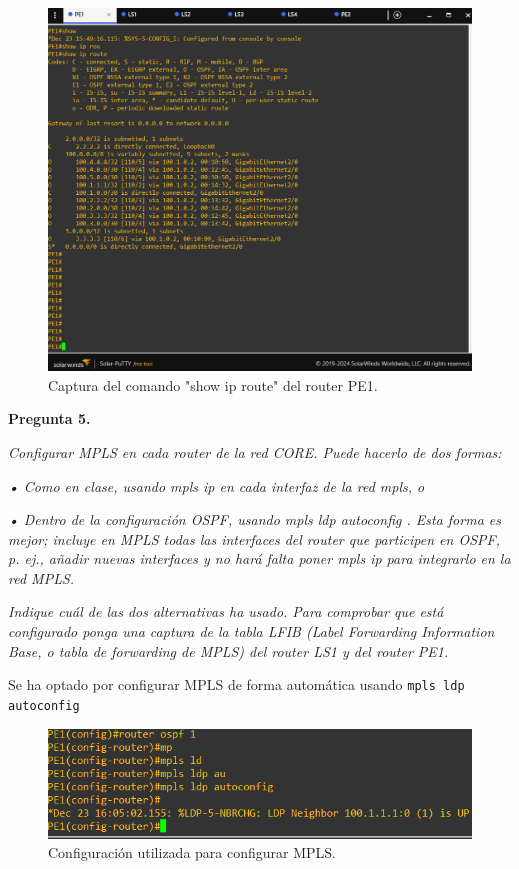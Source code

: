 \documentclass[a4paper, 12pt]{report}
\begin{document}
\begin{figure}[H]
	\centering
	\includegraphics[scale=0.4]{showiproutePE1.png}
	\caption{Captura del comando "show ip route" del router PE1.}
	\label{fig:showiproutePE1}
\end{figure}

\newpage
\textbf{Pregunta 5.}

\textit{Configurar MPLS en cada router de la red CORE. Puede hacerlo de dos formas:}

\textit{• Como en clase, usando mpls ip en cada interfaz de la red mpls, o}

\textit{• Dentro de la configuración OSPF, usando mpls ldp autoconfig . Esta forma es mejor; incluye en MPLS todas las interfaces del router que participen en OSPF, p. ej., añadir nuevas interfaces y no hará falta poner mpls ip para integrarlo en la red MPLS.}

\textit{Indique cuál de las dos alternativas ha usado. Para comprobar que está configurado ponga una
captura de la tabla LFIB (Label Forwarding Information Base, o tabla de forwarding de MPLS) del
router LS1 y del router PE1.}

Se ha optado por configurar MPLS de forma automática usando \texttt{mpls ldp autoconfig}
\begin{figure}[H]
	\centering
	\includegraphics[scale=0.8]{mplsautoconfig.png}
	\caption{Configuración utilizada para configurar MPLS.}
	\label{fig:mplsautoconfig}
\end{figure}
\end{document}
